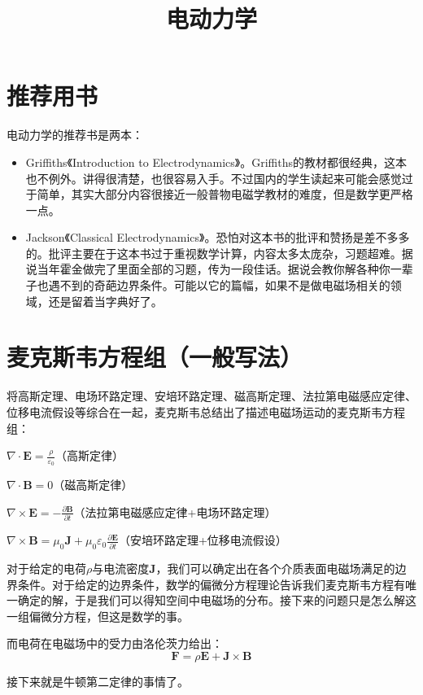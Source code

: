 \documentclass{ctexart}
\begin{document}
\title{电动力学}
\maketitle
\tableofcontents
\section{推荐用书}
电动力学的推荐书是两本：

\begin{itemize}
\item Griffiths《Introduction to Electrodynamics》。Griffiths的教材都很经典，这本也不例外。讲得很清楚，也很容易入手。不过国内的学生读起来可能会感觉过于简单，其实大部分内容很接近一般普物电磁学教材的难度，但是数学更严格一点。
\item Jackson《Classical Electrodynamics》。恐怕对这本书的批评和赞扬是差不多多的。批评主要在于这本书过于重视数学计算，内容太多太庞杂，习题超难。据说当年霍金做完了里面全部的习题，传为一段佳话。据说会教你解各种你一辈子也遇不到的奇葩边界条件。可能以它的篇幅，如果不是做电磁场相关的领域，还是留着当字典好了。
\end{itemize}

\section{麦克斯韦方程组（一般写法）}
将高斯定理、电场环路定理、安培环路定理、磁高斯定理、法拉第电磁感应定律、位移电流假设等综合在一起，麦克斯韦总结出了描述电磁场运动的麦克斯韦方程组：

$\nabla\cdot\bm{E}=\frac{\rho}{\varepsilon_0}$（高斯定律）

$\nabla\cdot\bm{B}=0$（磁高斯定律）

$\nabla\times\bm{E}=-\frac{\partial\bm{B}}{\partial t}$（法拉第电磁感应定律+电场环路定理）

$\nabla\times\bm{B}=\mu_0\bm{J}+\mu_0\varepsilon_0\frac{\partial\bm{E}}{\partial t}$（安培环路定理+位移电流假设）

对于给定的电荷$\rho$与电流密度$\bm{J}$，我们可以确定出在各个介质表面电磁场满足的边界条件。对于给定的边界条件，数学的偏微分方程理论告诉我们麦克斯韦方程有唯一确定的解，于是我们可以得知空间中电磁场的分布。接下来的问题只是怎么解这一组偏微分方程，但这是数学的事。

而电荷在电磁场中的受力由洛伦茨力给出：
\begin{equation}
\bm{F}=\rho\bm{E}+\bm{J}\times\bm{B}
\end{equation}

接下来就是牛顿第二定律的事情了。
\end{document}
